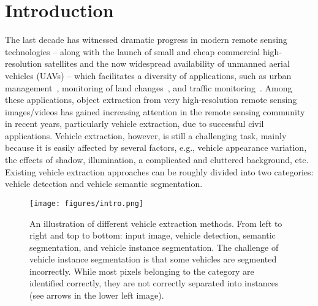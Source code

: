 \documentclass[journal]{IEEEtran}
\begin{document}
\IEEEpeerreviewmaketitle

\section{Introduction}
\label{sec:intro}
The last decade has witnessed dramatic progress in modern remote sensing technologies -- along with the launch of small and cheap commercial high-resolution satellites and the now widespread availability of unmanned aerial vehicles (UAVs) -- which facilitates a diversity of applications, such as urban management~\cite{Volpi17,dfc16joint,Audebert17,rifcn}, monitoring of land changes~\cite{Vakalopoulou16,Wen16,Wu17,Lyu16}, and traffic monitoring~\cite{MouDFC16,Kopsiaftis15}. Among these applications, object extraction from very high-resolution remote sensing images/videos has gained increasing attention in the remote sensing community in recent years, particularly vehicle extraction, due to successful civil applications. Vehicle extraction, however, is still a challenging task, mainly because it is easily affected by several factors, e.g., vehicle appearance variation, the effects of shadow, illumination, a complicated and cluttered background, etc. Existing vehicle extraction approaches can be roughly divided into two categories: vehicle detection and vehicle semantic segmentation.

\begin{figure}[t]
\centering
\texttt{[image: figures/intro.png]}
\renewcommand{\figurename}{Fig}
\caption{\label{fig:intro} An illustration of different vehicle extraction methods. From left to right and top to bottom: input image, vehicle detection, semantic segmentation, and vehicle instance segmentation. The challenge of vehicle instance segmentation is that some vehicles are segmented incorrectly. While most pixels belonging to the category are identified correctly, they are not correctly separated into instances (see arrows in the lower left image).}
\end{figure}
\end{document}
